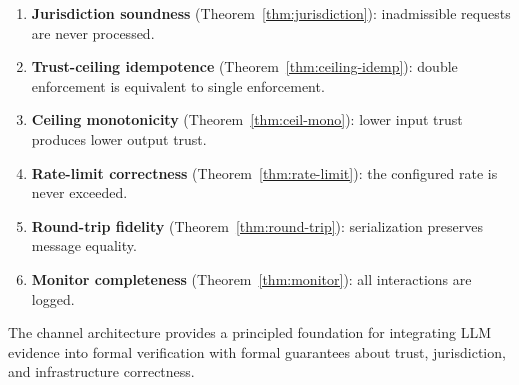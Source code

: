 \documentclass[11pt]{article}
\begin{document}
\begin{enumerate}
\item \textbf{Jurisdiction soundness}
  (Theorem~\ref{thm:jurisdiction}): inadmissible requests are
  never processed.

\item \textbf{Trust-ceiling idempotence}
  (Theorem~\ref{thm:ceiling-idemp}): double enforcement is
  equivalent to single enforcement.

\item \textbf{Ceiling monotonicity}
  (Theorem~\ref{thm:ceil-mono}): lower input trust produces
  lower output trust.

\item \textbf{Rate-limit correctness}
  (Theorem~\ref{thm:rate-limit}): the configured rate is
  never exceeded.

\item \textbf{Round-trip fidelity}
  (Theorem~\ref{thm:round-trip}): serialization preserves
  message equality.

\item \textbf{Monitor completeness}
  (Theorem~\ref{thm:monitor}): all interactions are logged.
\end{enumerate}

The channel architecture provides a principled foundation for
integrating LLM evidence into formal verification with formal
guarantees about trust, jurisdiction, and infrastructure correctness.
\end{document}
